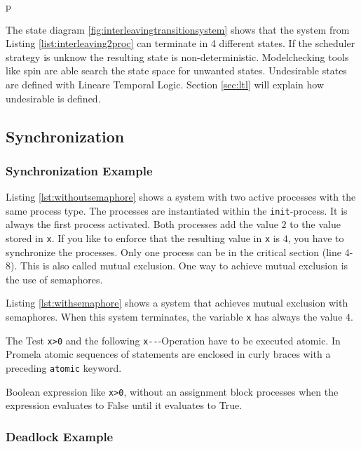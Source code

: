 p\documentclass[a4paper, twoside]{article}
\begin{document}
The state diagram \ref{fig:interleavingtransitionsystem} shows that the system from Listing \ref{list:interleaving2proc} can terminate in 4 different states. If the scheduler strategy is unknow the resulting state is non-deterministic. Modelchecking tools like spin are able search the state space for unwanted states. Undesirable states are defined with Lineare Temporal Logic. Section \ref{sec:ltl} will explain how undesirable is defined.

\subsection{Synchronization}
\label{sec:synchronization}

\subsubsection{Synchronization Example}
\label{sec:syncexample}

Listing \ref{lst:withoutsemaphore} shows a system with two active processes with the same process type. The processes are instantiated within the \verb|init|-process. It is always the first process activated. Both processes add the value $2$ to the value stored in \verb|x|. If you like to enforce that the resulting value in \verb|x| is $4$, you have to synchronize the processes. Only one process can be in the critical section (line 4-8). This is also called mutual exclusion. One way to achieve mutual exclusion is the use of semaphores.

Listing \ref{lst:withsemaphore} shows a system that achieves mutual exclusion with semaphores. When this system terminates, the variable \verb|x| has always the value $4$.



The Test \verb|x>0| and the following \verb|x--|-Operation have to be executed atomic. In Promela atomic sequences of statements are enclosed in curly braces with a preceding \verb|atomic| keyword.

Boolean expression like \verb|x>0|, without an assignment block processes when the expression evaluates to False until it evaluates to True.



\subsubsection{Deadlock Example}
\label{sec:deadlock}
\end{document}
